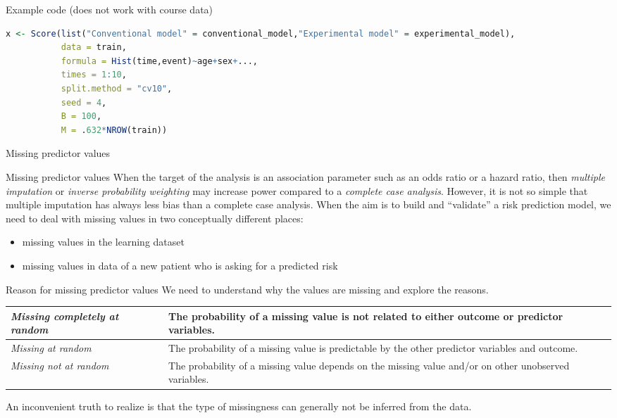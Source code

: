 \documentclass{beamer}\usepackage{listings}
\begin{document}
\begin{frame}[label={sec:orgab6cb05},fragile]{Example code (does not work with course data)}
 \begin{lstlisting}[language=r,numbers=none,otherkeywords={formula,times,event,Hist}, deletekeywords={model,data,NROW,split,null}]
x <- Score(list("Conventional model" = conventional_model,"Experimental model" = experimental_model),
           data = train,
           formula = Hist(time,event)~age+sex+...,
           times = 1:10,
           split.method = "cv10",
           seed = 4,
           B = 100,
           M = .632*NROW(train))
\end{lstlisting}
\end{frame}
\begin{frame}[label={sec:org9d8d1d7}]{}
\huge \color{white}
Missing predictor values
\end{frame}
\begin{frame}[label={sec:org513932a}]{Missing predictor values}
When the target of the analysis is an association parameter such as an
odds ratio or a hazard ratio, then \emph{multiple imputation} or \emph{inverse
probability weighting} may increase power compared to a \emph{complete case
analysis}.
\vfill
However, it is not so simple that multiple imputation has always less bias 
than a complete case analysis.
\vfill
When the aim is to build and ``validate'' a risk prediction model, we need to
deal with missing values in two conceptually different places: 

\begin{itemize}
\item missing values in the learning dataset
\item missing values in data of a new patient who is asking for a predicted risk
\end{itemize}
\end{frame}
\begin{frame}[label={sec:orgfdca57a}]{Reason for missing predictor values}
We need to understand \alert{why} the values are missing and explore the reasons.

\begin{center}
\begin{tabular}{m{3cm}m{8cm}}
\hline
\emph{Missing completely at random} & The probability of a missing value is not related to either outcome or predictor variables.\\
\hline
\emph{Missing at random} & The probability of a missing value is predictable by the other predictor variables \alert{and outcome}.\\
\hline
\emph{Missing not at random} & The probability of a missing value depends on the missing value and/or on other unobserved variables.\\
\hline
\end{tabular}
\end{center}

An inconvenient truth to realize is that the type of missingness can
generally not be inferred from the data. 
\end{frame}
\end{document}
